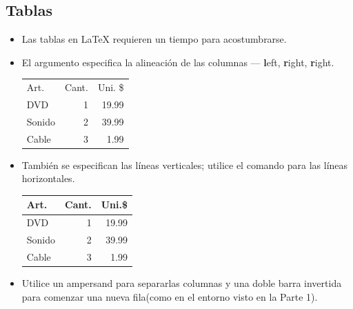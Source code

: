 \documentclass{beamer}
\begin{document}
\subsection{Tablas}
\begin{frame}[fragile]{\insertsubsection}
  \begin{itemize}
  \item Las tablas en \LaTeX{} requieren un tiempo para acostumbrarse.
  \item El argumento especifica la alineación de las columnas ---
\textbf{l}eft, \textbf{r}ight, \textbf{r}ight.
    \begin{exampletwouptiny}
\begin{tabular}{lrr}
  Art.   & Cant. & Uni. \$ \\
  DVD    & 1     & 19.99   \\
  Sonido & 2     & 39.99   \\
  Cable  & 3     & 1.99    \\
\end{tabular}
    \end{exampletwouptiny}
  \item También se especifican las líneas verticales; utilice el
comando  para las líneas horizontales.
    \begin{exampletwouptiny}
\begin{tabular}{|l|r|r|}    \hline
  Art.   & Cant. & Uni.\$ \\\hline
  DVD    & 1     & 19.99  \\
  Sonido & 2     & 39.99  \\
  Cable  & 3     & 1.99   \\\hline
\end{tabular}
    \end{exampletwouptiny}
  \item Utilice un ampersand \keystrokebftt{\&} para separarlas
columnas y una doble barra invertida
\keystrokebftt{\bs}\keystrokebftt{\bs} para comenzar una nueva
fila(como en el entorno  visto en la Parte 1).
  \end{itemize}
\end{frame}

\end{document}
